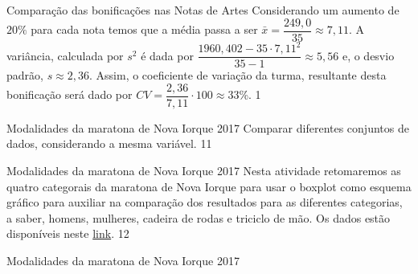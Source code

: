 {\begin{answer}{Comparação das bonificações nas Notas de Artes}
{Considerando um aumento de $20\%$ para cada nota temos que a média passa a ser $\bar{x}=\dfrac{249{,}0}{35}\approx7{,}11$. A variância, calculada por $s^2$ é dada por $\dfrac{1960{,}402-35\cdot7{,}11^2}{35-1}\approx5{,}56$ e, o desvio padrão, $s\approx2{,}36$. Assim, o coeficiente de variação da turma, resultante desta bonificação será dado por $CV=\dfrac{2{,}36}{7{,}11}\cdot100\approx33$\%.
}{1}
\end{answer}
\begin{objectives}{Modalidades da maratona de Nova Iorque 2017}
{
 Comparar diferentes conjuntos de dados, considerando a mesma variável.
}{1}{1}
\end{objectives}
\begin{sugestions}{Modalidades da maratona de Nova Iorque 2017}
{
Nesta atividade retomaremos as quatro categorais da maratona de Nova Iorque para usar o boxplot como esquema gráfico para auxiliar na comparação dos resultados para as diferentes categorias, a saber, homens, mulheres, cadeira de rodas e triciclo de mão. Os dados estão disponíveis neste \href{https://ggbm.at/ZhqKD9Nz}{link}.
}{1}{2}
\end{sugestions}
\begin{answer}{Modalidades da maratona de Nova Iorque 2017}
{
}
\end{answer}}
